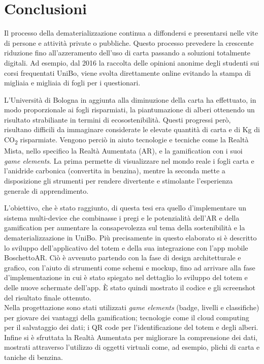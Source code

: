 \chapter{Conclusioni}

Il processo della dematerializzazione continua a diffondersi e presentarsi nelle vite di persone e attività private o pubbliche.
Questo processo prevedere la crescente riduzione fino all'azzeramento dell'uso di carta passando a soluzioni totalmente digitali. Ad esempio, dal 2016 la raccolta delle opinioni anonime degli studenti sui corsi frequentati UniBo, viene svolta direttamente online evitando la stampa di migliaia e migliaia di fogli per i questionari.
\vspace{\baselineskip}

L'Università di Bologna in aggiunta alla diminuzione della carta ha effettuato, in modo proporzionale ai fogli risparmiati, la piantumazione di alberi ottenendo un risultato strabiliante in termini di ecosostenibilità. Questi progressi però, risultano difficili da immaginare considerate le elevate quantità di carta e di Kg di CO\textsubscript{2} risparmiate.
Vengono perciò in aiuto tecnologie e tecniche come la Realtà Mista, nello specifico la Realtà Aumentata (AR), e la gamification con i suoi \textit{game elements}. La prima permette di visualizzare nel mondo reale i fogli carta e l'anidride carbonica (convertita in benzina), mentre la seconda mette a disposizione gli strumenti per rendere divertente e stimolante l'esperienza generale di apprendimento.
\vspace{10pt}

L'obiettivo, che è stato raggiunto, di questa tesi era quello d'implementare un sistema multi-device che combinasse i pregi e le potenzialità dell'AR e della gamification per aumentare la consapevolezza sul tema della sostenibilità e la dematerializzazione in UniBo.
Più precisamente in questo elaborato si è descritto lo sviluppo dell'applicativo del totem e della sua integrazione con l'app mobile BoschettoAR. Ciò è avvenuto partendo con la fase di design architetturale e grafico, con l'aiuto di strumenti come schemi e mockup, fino ad arrivare alla fase d'implementazione in cui è stato spiegato nel dettaglio lo sviluppo del totem e delle nuove schermate dell'app. \`E stato quindi mostrato il codice e gli screenshot del risultato finale ottenuto.
\vspace{\baselineskip}
\\
Nella progettazione sono stati utilizzati \textit{game elements} (badge, livelli e classifiche) per giovare dei vantaggi della gamification; tecnologie come il cloud computing per il salvataggio dei dati; i QR code per l'identificazione del totem e degli alberi. Infine si è sfruttata la Realtà Aumentata per migliorare la comprensione dei dati, mostrati attraverso l'utilizzo di oggetti virtuali come, ad esempio, plichi di carta e taniche di benzina.

